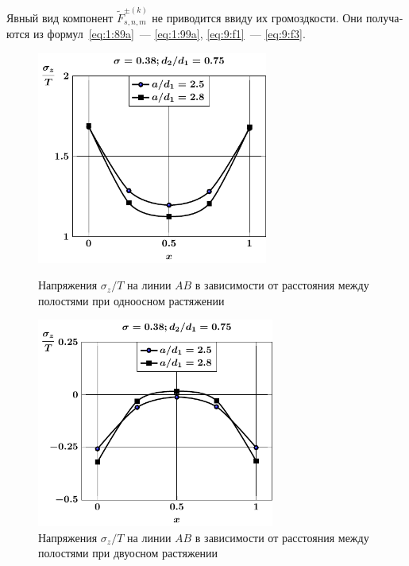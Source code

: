 \begin{russian}
Явный вид компонент $\tilde F_{s,n,m}^{\pm(k)}$ не приводится ввиду их громоздкости. Они получаются из формул~\eqref{eq:1:89a}~--- \eqref{eq:1:99a}, \eqref{eq:9:f1}~--- \eqref{eq:9:f3}.

\begin{figure}[h!]
\centering\footnotesize
\parbox[b]{7.5cm}{\centering\includegraphics[width=7.6cm]{periodic-cav27-a-d75-t1-sig_z.pdf}
\caption{Напряжения $\sigma_z/T$ на линии $AB$ в зависимости от расстояния между полостями при одноосном растяжении
\label{f:11:24}}}\hfil\hfil
\parbox[b]{7.5cm}{\centering\includegraphics[width=7.8cm]{periodic-cav27-a-d75-t2-sig_z.pdf}
\caption{Напряжения $\sigma_z/T$ на линии $AB$ в зависимости от расстояния между полостями при двуосном растяжении
\label{f:11:25}}}
\end{figure}


\end{russian}
